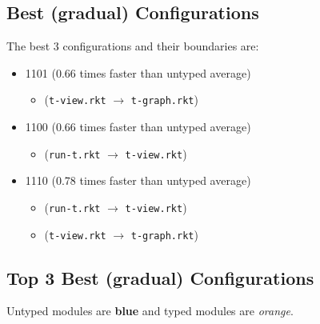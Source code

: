 \documentclass{article}
\newcommand{\mono}[1]{\texttt{#1}}
\begin{document}
\subsection{Best (gradual) Configurations}
The best 3 configurations and their boundaries are:
\begin{itemize}
\item 1101 (0.66 times faster than untyped average)
  \begin{itemize}
  \item (\mono{t-view.rkt} $\rightarrow$ \mono{t-graph.rkt})
  \end{itemize}
\item 1100 (0.66 times faster than untyped average)
  \begin{itemize}
  \item (\mono{run-t.rkt} $\rightarrow$ \mono{t-view.rkt})
  \end{itemize}
\item 1110 (0.78 times faster than untyped average)
  \begin{itemize}
  \item (\mono{run-t.rkt} $\rightarrow$ \mono{t-view.rkt})
  \item (\mono{t-view.rkt} $\rightarrow$ \mono{t-graph.rkt})
  \end{itemize}
\end{itemize}

\subsection{Top 3 Best (gradual) Configurations}
Untyped modules are \textbf{blue} and typed modules are \emph{orange}.
\end{document}
